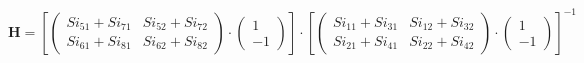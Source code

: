\[ \mathbf{H} = \left[ \left(\begin{smallmatrix} Si_{51} + Si_{71} & Si_{52} + Si_{72} \\ Si_{61} + Si_{81} & Si_{62} + Si_{82} \end{smallmatrix}\right) \cdot \left(\begin{smallmatrix} 1 \\ -1 \end{smallmatrix}\right) \right]\cdot\left[ \left(\begin{smallmatrix} Si_{11} + Si_{31} & Si_{12} + Si_{32} \\ Si_{21} + Si_{41} & Si_{22} + Si_{42} \end{smallmatrix}\right) \cdot \left(\begin{smallmatrix} 1 \\ -1 \end{smallmatrix}\right) \right]^{-1} \]
